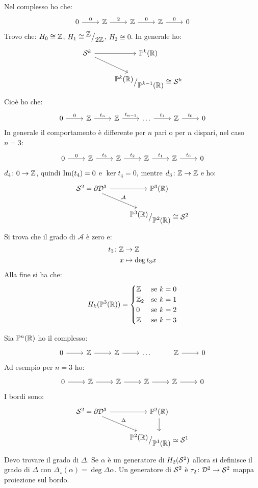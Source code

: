 Nel complesso ho che:
\[
  \begin{tikzcd}
    0 \rar{0} & \Z \rar{2} & \Z \rar{0} & \Z \rar{0} & 0
  \end{tikzcd}
\]
Trovo che: $ H_0 \cong \mathbb{Z} $, $ H_1 \cong {^{\textstyle \mathbb{Z}}\big/_{\textstyle 2 \mathbb{Z}}} $, $ H_2 \cong 0 $.
In generale ho:
\[
  \begin{tikzcd}
    \Sph{k} \rar \arrow{rd}{} & \Pjr{k} \\
    {} & \quot{\Pjr{k}}{\Pjr{k-1}} \cong \Sph{k}
  \end{tikzcd}
\]
Cioè ho che:
\[
  \begin{tikzcd}
    0 \rar{0} & \Z \rar{t_n} & \Z \rar{t_{n-1}} & \dots \rar{t_1 }& \Z \rar{t_0} & 0
  \end{tikzcd}
\]
In generale il comportamento è differente per $ n $ pari o per $ n $
dispari, nel caso $ n = 3 $:
\[
  \begin{tikzcd}
    0 \rar{0} & \Z \rar{t_3} & \Z \rar{t_{2}} & \Z \rar{t_1}& \Z \rar{t_0} & 0
  \end{tikzcd}
\]
$ d_4 \colon 0 \to \mathbb{Z} $, quindi $ \mathrm{Im}( t_4 ) = 0 $ e $ \ker{t_4} = 0 $,
mentre $ d_3 \colon \mathbb{Z} \to \mathbb{Z} $ e ho:
\[
  \begin{tikzcd}
    \Sph{2} = \partial \Disk{3} \rar \arrow{rd}{\mathcal{A}} & \Pjr{3} \\
    {} & \quot{\Pjr{3}}{\Pjr{2}} \cong \Sph{2}
  \end{tikzcd}
\]
Si trova che il grado di $ \mathcal{A} $ è zero e:
\begin{align*}
  t_3 \colon \mathbb{Z} & \to \mathbb{Z} \\
  x & \mapsto \deg{t_3} x
\end{align*}
Alla fine si ha che:
\[
  H_k(\mathbb{P}^{3} (\mathbb{R})) =
  \begin{cases}
    \mathbb{Z} & \text{se } k = 0 \\
    \mathbb{Z}_2 & \text{se } k = 1 \\
    0 & \text{se } k = 2 \\
    \mathbb{Z} & \text{se } k = 3
  \end{cases}
\]

Sia $ \mathbb{P}^{n} (\mathbb{R}) $ ho il complesso:
\[
  \begin{tikzcd}
    0 \rar & \Z \rar & \Z \rar & \dots & \Z \rar & 0
  \end{tikzcd}
\]
Ad esempio per $ n = 3 $ ho:
\[
  \begin{tikzcd}
    0 \rar & \Z \rar & \Z \rar & \Z \rar  & \Z \rar & 0
  \end{tikzcd}
\]
I bordi sono:
\[
  \begin{tikzcd}
    \Sph{2} = \partial \Disk{3} \rar \arrow{dr}{\Delta} & \Pjr{2} \dar \\
    {} & \quot{\Pjr{2}}{\Pjr{1}} \simeq \Sph{1}
  \end{tikzcd}
\]
Devo trovare il grado di $ \Delta $. Se $ \alpha $ è un generatore di
$ H_2(\mathcal{S}^{2}) $ allora si definisce il grado di $ \Delta $ con
$ \Delta_\star(\alpha) = \deg{\Delta} \alpha $. Un generatore di $ \mathcal{S}^{2} $ è
$ \tau_2 \colon \mathcal{D}^{2} \to \mathcal{S}^{2} $ mappa proiezione sul bordo.

